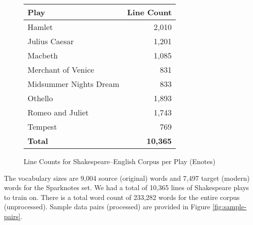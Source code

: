 \documentclass[twoside,twocolumn]{article}
\begin{document}
\begin{figure}[ht]
    \centering
    \begin{tabular}{ |l|r| }
        \hline
        \textbf{Play}
          & \textbf{Line Count} \\
        \hline
        Hamlet & 2,010 \\ \hline
        Julius Caesar & 1,201 \\ \hline
        Macbeth & 1,085 \\ \hline
        Merchant of Venice & 831 \\ \hline
        Midsummer Nights Dream & 833 \\ \hline
        Othello & 1,893 \\ \hline
        Romeo and Juliet & 1,743 \\ \hline
        Tempest & 769 \\ \hline
        \textbf{Total} & \textbf{10,365} \\ \hline
    \end{tabular}

    \caption{Line Counts for Shakespeare--English Corpus per Play (Enotes)}
    \label{fig:data-lines-enotes}
\end{figure}

The vocabulary sizes are 9,004 source (original) words and
7,497 target (modern) words for the Sparknotes set. We had a total of 10,365
lines of Shakespeare plays to train on. There is a total word count of 233,282
words for the entire corpus (unprocessed). Sample data pairs (processed) are
provided in Figure \ref{fig:sample-pairs}.
\end{document}
